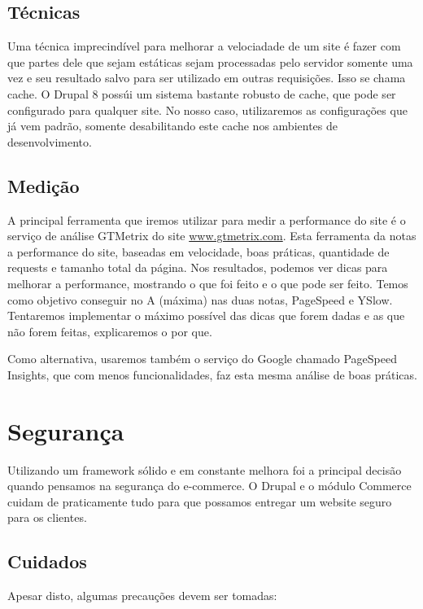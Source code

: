 \documentclass[
	12pt,				%
    oneside,			%
	a4paper,			%
	english,			%
	french,				%
	spanish,			%
	brazil				%
	]{abntex2}
\begin{document}
\subsection{Técnicas}
Uma técnica imprecindível para melhorar a velociadade de um site é fazer com que partes dele que sejam estáticas sejam processadas pelo servidor somente uma vez e seu resultado salvo para ser utilizado em outras requisições. Isso se chama cache. O Drupal 8 possúi um sistema bastante robusto de cache, que pode ser configurado para qualquer site. No nosso caso, utilizaremos as configurações que já vem padrão, somente desabilitando este cache nos ambientes de desenvolvimento.

\subsection{Medição}
A principal ferramenta que iremos utilizar para medir a performance do site é o serviço de análise GTMetrix do site \url{www.gtmetrix.com}. Esta ferramenta da notas a performance do site, baseadas em velocidade, boas práticas, quantidade de requests e tamanho total da página. Nos resultados, podemos ver dicas para melhorar a performance, mostrando o que foi feito e o que pode ser feito. Temos como objetivo conseguir no A (máxima) nas duas notas, PageSpeed e YSlow. Tentaremos implementar o máximo possível das dicas que forem dadas e as que não forem feitas, explicaremos o por que.

Como alternativa, usaremos também o serviço do Google chamado PageSpeed Insights, que com menos funcionalidades, faz esta mesma análise de boas práticas.


\section{Segurança}

Utilizando um framework sólido e em constante melhora foi a principal decisão quando pensamos na segurança do e-commerce. O Drupal e o módulo Commerce cuidam de praticamente tudo para que possamos entregar um website seguro para os clientes.

\subsection{Cuidados}
Apesar disto, algumas precauções devem ser tomadas:
\end{document}
